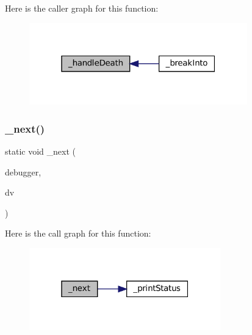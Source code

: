 Here is the caller graph for this function\+:
\nopagebreak
\begin{figure}[H]
\begin{center}
\leavevmode
\includegraphics[width=268pt]{debugger_2cli-debugger_8c_a829639f778965123a1bd18bf71a3ffb0_icgraph}
\end{center}
\end{figure}
\mbox{\label{debugger_2cli-debugger_8c_a6494b4411028b9b2f2f443f8b66dc486}} 
\subsubsection{\texorpdfstring{\+\_\+next()}{\_next()}}
{\footnotesize\ttfamily static void \+\_\+next (\begin{DoxyParamCaption}\item[{struct C\+L\+I\+Debugger $\ast$}]{debugger,  }\item[{struct C\+L\+I\+Debug\+Vector $\ast$}]{dv }\end{DoxyParamCaption})\hspace{0.3cm}{\ttfamily [static]}}

Here is the call graph for this function\+:
\nopagebreak
\begin{figure}[H]
\begin{center}
\leavevmode
\includegraphics[width=235pt]{debugger_2cli-debugger_8c_a6494b4411028b9b2f2f443f8b66dc486_cgraph}
\end{center}
\end{figure}
\mbox{\label{debugger_2cli-debugger_8c_a0d63a2c337b6190b0b5488e84b39beb6}} 
